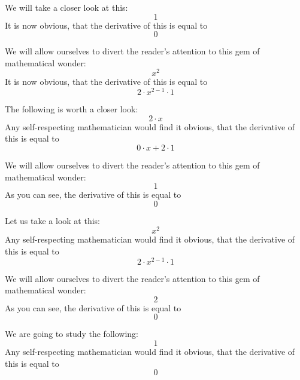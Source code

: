 \documentclass{article}
\begin{document}
We will take a closer look at this:
\begin{equation}
1 
\end{equation}
It is now obvious, that the derivative of this is equal to
\begin{equation}
0 
\end{equation}

We will allow ourselves to divert the reader's attention to this gem of mathematical wonder:
\begin{equation}
x ^{2 } 
\end{equation}
It is now obvious, that the derivative of this is equal to
\begin{equation}
2 \cdot x ^{2 - 1 } \cdot 1 
\end{equation}

The following is worth a closer look:
\begin{equation}
2 \cdot x 
\end{equation}
Any self-respecting mathematician would find it obvious, that the derivative of this is equal to
\begin{equation}
0 \cdot x + 2 \cdot 1 
\end{equation}

We will allow ourselves to divert the reader's attention to this gem of mathematical wonder:
\begin{equation}
1 
\end{equation}
As you can see, the derivative of this is equal to
\begin{equation}
0 
\end{equation}

Let us take a look at this:
\begin{equation}
x ^{2 } 
\end{equation}
Any self-respecting mathematician would find it obvious, that the derivative of this is equal to
\begin{equation}
2 \cdot x ^{2 - 1 } \cdot 1 
\end{equation}

We will allow ourselves to divert the reader's attention to this gem of mathematical wonder:
\begin{equation}
2 
\end{equation}
As you can see, the derivative of this is equal to
\begin{equation}
0 
\end{equation}

We are going to study the following:
\begin{equation}
1 
\end{equation}
Any self-respecting mathematician would find it obvious, that the derivative of this is equal to
\begin{equation}
0 
\end{equation}
\end{document}
